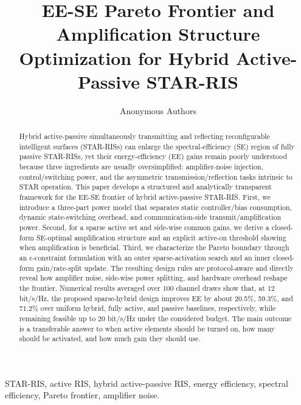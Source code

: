 \documentclass[journal]{IEEEtran}
\begin{document}
\title{EE-SE Pareto Frontier and Amplification Structure Optimization for Hybrid Active-Passive STAR-RIS}

\author{Anonymous Authors}

\maketitle

\begin{abstract}
Hybrid active-passive simultaneously transmitting and reflecting reconfigurable intelligent surfaces (STAR-RISs) can enlarge the spectral-efficiency (SE) region of fully passive STAR-RISs, yet their energy-efficiency (EE) gains remain poorly understood because three ingredients are usually oversimplified: amplifier-noise injection, control/switching power, and the asymmetric transmission/reflection tasks intrinsic to STAR operation. This paper develops a structured and analytically transparent framework for the EE-SE frontier of hybrid active-passive STAR-RIS. First, we introduce a three-part power model that separates static controller/bias consumption, dynamic state-switching overhead, and communication-side transmit/amplification power. Second, for a sparse active set and side-wise common gains, we derive a closed-form SE-optimal amplification structure and an explicit active-on threshold showing when amplification is beneficial. Third, we characterize the Pareto boundary through an $\epsilon$-constraint formulation with an outer sparse-activation search and an inner closed-form gain/rate-split update. The resulting design rules are protocol-aware and directly reveal how amplifier noise, side-wise power splitting, and hardware overhead reshape the frontier. Numerical results averaged over $100$ channel draws show that, at $12$ bit/s/Hz, the proposed sparse-hybrid design improves EE by about 20.5\%, 59.3\%, and 71.2\% over uniform hybrid, fully active, and passive baselines, respectively, while remaining feasible up to $20$ bit/s/Hz under the considered budget. The main outcome is a transferable answer to when active elements should be turned on, how many should be activated, and how much gain they should use.
\end{abstract}

\begin{IEEEkeywords}
STAR-RIS, active RIS, hybrid active-passive RIS, energy efficiency, spectral efficiency, Pareto frontier, amplifier noise.
\end{IEEEkeywords}
\end{document}
